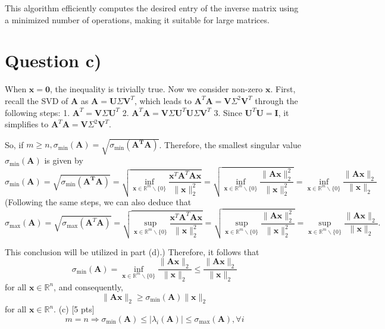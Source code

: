 \documentclass{article}
\begin{document}
This algorithm efficiently computes the desired entry of the inverse matrix using a minimized number of operations, making it suitable for large matrices.
\section{Question c)}

When $\boldsymbol{x}=\mathbf{0}$, the inequality is trivially true. Now we consider non-zero $\boldsymbol{x}$.
First, recall the SVD of $\boldsymbol{A}$ as $\boldsymbol{A}=\boldsymbol{U} \Sigma \boldsymbol{V}^T$, which leads to $\boldsymbol{A}^T \boldsymbol{A}=\boldsymbol{V} \Sigma^2 \boldsymbol{V}^T$ through the following steps:
1. $\boldsymbol{A}^T=\boldsymbol{V} \Sigma \boldsymbol{U}^T$
2. $\boldsymbol{A}^T \boldsymbol{A}=\boldsymbol{V} \Sigma \boldsymbol{U}^T \boldsymbol{U} \Sigma \boldsymbol{V}^T$
3. Since $\boldsymbol{U}^T \boldsymbol{U}=\boldsymbol{I}$, it simplifies to $\boldsymbol{A}^T \boldsymbol{A}=\boldsymbol{V} \Sigma^2 \boldsymbol{V}^T$.

So, if $m \geq n, \sigma_{\min }(\boldsymbol{A})=\sqrt{\sigma_{\min }\left(\boldsymbol{A}^{\boldsymbol{T}} \boldsymbol{A}\right)}$.
Therefore, the smallest singular value $\sigma_{\min }(\boldsymbol{A})$ is given by
$$
\sigma_{\min }(\boldsymbol{A})=\sqrt{\sigma_{\min }\left(\boldsymbol{A}^{\boldsymbol{T}} \boldsymbol{A}\right)}=\sqrt{\inf _{\boldsymbol{x} \in \mathbb{R}^m \backslash\{0\}} \frac{\boldsymbol{x}^T \boldsymbol{A}^T \boldsymbol{A} \boldsymbol{x}}{\|\boldsymbol{x}\|_2^2}}=\sqrt{\inf _{\boldsymbol{x} \in \mathbb{R}^m \backslash\{0\}} \frac{\|\boldsymbol{A} \boldsymbol{x}\|_2^2}{\|\boldsymbol{x}\|_2^2}}=\inf _{\boldsymbol{x} \in \mathbb{R}^m \backslash\{0\}} \frac{\|\boldsymbol{A} \boldsymbol{x}\|_2}{\|\boldsymbol{x}\|_2}
$$(Following the same steps, we can also deduce that
$$
\sigma_{\max }(\boldsymbol{A})=\sqrt{\sigma_{\max }\left(\boldsymbol{A}^T \boldsymbol{A}\right)}=\sqrt{\sup _{\boldsymbol{x} \in \mathbb{R}^m \backslash\{0\}} \frac{\boldsymbol{x}^T \boldsymbol{A}^T \boldsymbol{A} \boldsymbol{x}}{\|\boldsymbol{x}\|_2^2}}=\sqrt{\sup _{\boldsymbol{x} \in \mathbb{R}^m \backslash\{0\}} \frac{\|\boldsymbol{A} \boldsymbol{x}\|_2^2}{\|\boldsymbol{x}\|_2^2}}=\sup _{\boldsymbol{x} \in \mathbb{R}^m \backslash\{0\}} \frac{\|\boldsymbol{A} \boldsymbol{x}\|_2}{\|\boldsymbol{x}\|_2} .
$$

This conclusion will be utilized in part (d).)
Therefore, it follows that
$$
\sigma_{\min }(\boldsymbol{A})=\inf _{\boldsymbol{x} \in \mathbb{R}^m \backslash\{0\}} \frac{\|\boldsymbol{A} \boldsymbol{x}\|_2}{\|\boldsymbol{x}\|_2} \leq \frac{\|\boldsymbol{A} \boldsymbol{x}\|_2}{\|\boldsymbol{x}\|_2}
$$
for all $\boldsymbol{x} \in \mathbb{R}^n$, and consequently,
$$
\|\boldsymbol{A} \boldsymbol{x}\|_2 \geq \sigma_{\min }(\boldsymbol{A})\|\boldsymbol{x}\|_2
$$
for all $\boldsymbol{x} \in \mathbb{R}^n$.
(c) [5 pts]
$$
m=n \Rightarrow \sigma_{\min }(\boldsymbol{A}) \leq\left|\lambda_i(\boldsymbol{A})\right| \leq \sigma_{\max }(\boldsymbol{A}), \forall i
$$
\end{document}
